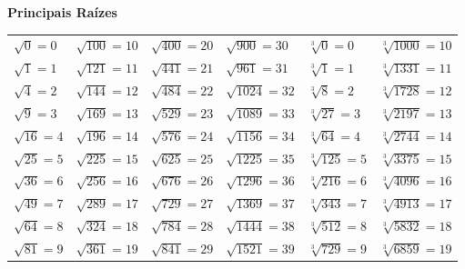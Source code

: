 \documentclass[12pt]{article}
\begin{document}
\vspace{0.5cm}
\begin{center}
\textbf{\Large Principais Raízes}
\vspace{0.5cm}

\setlength{\tabcolsep}{13pt}

\begin{tabular}{llllll}
$\sqrt{0}=0$&$\sqrt{100}=10$&$\sqrt{400}=20$&$\sqrt{900}=30$&$\sqrt[3]{0}=0$&$\sqrt[3]{1000}=10$\\
$\sqrt{1}=1$&$\sqrt{121}=11$&$\sqrt{441}=21$&$\sqrt{961}=31$&$\sqrt[3]{1}=1$&$\sqrt[3]{1331}=11$\\
$\sqrt{4}=2$&$\sqrt{144}=12$&$\sqrt{484}=22$&$\sqrt{1024}=32$&$\sqrt[3]{8}=2$&$\sqrt[3]{1728}=12$\\
$\sqrt{9}=3$&$\sqrt{169}=13$&$\sqrt{529}=23$&$\sqrt{1089}=33$&$\sqrt[3]{27}=3$&$\sqrt[3]{2197}=13$\\
$\sqrt{16}=4$&$\sqrt{196}=14$&$\sqrt{576}=24$&$\sqrt{1156}=34$&$\sqrt[3]{64}=4$&$\sqrt[3]{2744}=14$\\
$\sqrt{25}=5$&$\sqrt{225}=15$&$\sqrt{625}=25$&$\sqrt{1225}=35$&$\sqrt[3]{125}=5$&$\sqrt[3]{3375}=15$\\
$\sqrt{36}=6$&$\sqrt{256}=16$&$\sqrt{676}=26$&$\sqrt{1296}=36$&$\sqrt[3]{216}=6$&$\sqrt[3]{4096}=16$\\
$\sqrt{49}=7$&$\sqrt{289}=17$&$\sqrt{729}=27$&$\sqrt{1369}=37$&$\sqrt[3]{343}=7$&$\sqrt[3]{4913}=17$\\
$\sqrt{64}=8$&$\sqrt{324}=18$&$\sqrt{784}=28$&$\sqrt{1444}=38$&$\sqrt[3]{512}=8$&$\sqrt[3]{5832}=18$\\
$\sqrt{81}=9$&$\sqrt{361}=19$&$\sqrt{841}=29$&$\sqrt{1521}=39$&$\sqrt[3]{729}=9$&$\sqrt[3]{6859}=19$\\
\end{tabular}
\end{center}


\end{document}
